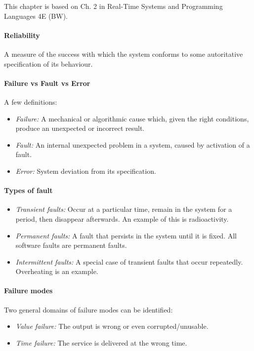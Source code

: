 
This chapter is based on Ch. 2 in Real-Time Systems and Programming Languages 4E (BW).

\sepline

\paragraph{Reliability} A measure of the success with which the system conforms to some autoritative specification of its behaviour.

\paragraph{Failure vs Fault vs Error} A few definitions:
\begin{itemize}
  \item \textit{Failure:} A mechanical or algorithmic cause which, given the right conditions, produce an unexpected or incorrect result.
  \item \textit{Fault:} An internal unexpected problem in a system, caused by activation of a fault.
  \item \textit{Error:} System deviation from its specification.
\end{itemize}



\paragraph{Types of fault}
\begin{itemize}[nolistsep,noitemsep]
  \item \textit{Transient faults:} Occur at a particular time, remain in the system for a period, then disappear afterwards. An example of this is radioactivity.
  \item \textit{Permanent faults:} A fault that persists in the system until it is fixed. All software faults are permanent faults.
  \item \textit{Intermittent faults:} A special case of transient faults that occur repeatedly. Overheating is an example.
\end{itemize}

\paragraph{Failure modes} Two general domains of failure modes can be identified:
\begin{itemize}[nolistsep,noitemsep]
  \item \textit{Value failure:} The output is wrong or even corrupted/unusable.
  \item \textit{Time failure:} The service is delivered at the wrong time.
\end{itemize}

